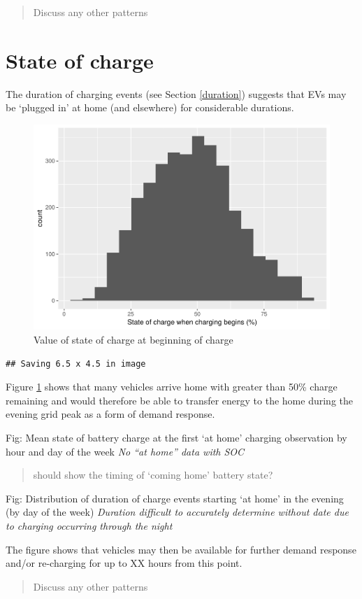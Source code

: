 \documentclass[]{article}
\begin{document}
\begin{quote}
Discuss any other patterns
\end{quote}

\section{State of charge}\label{state-of-charge}

The duration of charging events (see Section \ref{duration}) suggests
that EVs may be `plugged in' at home (and elsewhere) for considerable
durations.

\begin{figure}
\centering
\includegraphics{EVBB_SummaryReport_files/figure-latex/SoCplot2-1.pdf}
\caption{\label{fig:SoCplot2}Value of state of charge at beginning of
charge}
\end{figure}

\begin{verbatim}
## Saving 6.5 x 4.5 in image
\end{verbatim}

Figure \ref{fig:SoCplot2} shows that many vehicles arrive home with
greater than 50\% charge remaining and would therefore be able to
transfer energy to the home during the evening grid peak as a form of
demand response.

Fig: Mean state of battery charge at the first `at home' charging
observation by hour and day of the week \emph{No ``at home'' data with
SOC}

\begin{quote}
should show the timing of `coming home' battery state?
\end{quote}

Fig: Distribution of duration of charge events starting `at home' in the
evening (by day of the week) \emph{Duration difficult to accurately
determine without date due to charging occurring through the night}

The figure shows that vehicles may then be available for further demand
response and/or re-charging for up to XX hours from this point.

\begin{quote}
Discuss any other patterns
\end{quote}
\end{document}
